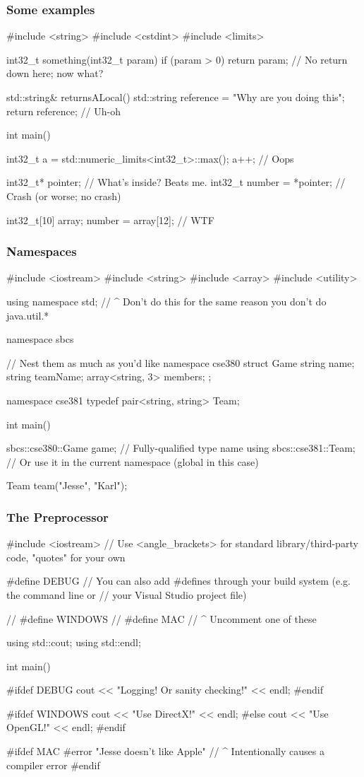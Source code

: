 \documentclass[glossy]{beamer}
\begin{document}
\begin{frame}[fragile=singleslide]
  \frametitle{Some examples}
  \begin{cppcode}
#include <string>
#include <cstdint> 
#include <limits> 

int32_t something(int32_t param) { 
  if (param > 0) return param; 
  // No return down here; now what? 
} 

std::string& returnsALocal() { 
  std::string reference = "Why are you doing this"; 
  return reference; // Uh-oh 
} 

int main() { 
  int32_t a = std::numeric_limits<int32_t>::max(); 
  a++; // Oops 

  int32_t* pointer; // What's inside?  Beats me.
  int32_t number = *pointer; // Crash (or worse; no crash)

  int32_t[10] array; 
  number = array[12]; // WTF 
}
  \end{cppcode}
\end{frame}

\begin{frame}[fragile=singleslide]
  \frametitle{Namespaces}
  \begin{cppcode}
#include <iostream>
#include <string>
#include <array>
#include <utility>

using namespace std;
// ^ Don't do this for the same reason you don't do java.util.*

namespace sbcs { // Nest them as much as you'd like
  namespace cse380 {
    struct Game {
      string name;
      string teamName;
      array<string, 3> members;
    };
  }

  namespace cse381 {
    typedef pair<string, string> Team;
  }
}

int main() {
  sbcs::cse380::Game game; // Fully-qualified type name
  using sbcs::cse381::Team; // Or use it in the current namespace (global in this case)

  Team team("Jesse", "Karl");
}
  \end{cppcode}
\end{frame}

\begin{frame}[fragile=singleslide]
  \frametitle{The Preprocessor}
  \begin{cppcode}
#include <iostream>
// Use <angle_brackets> for standard library/third-party code, "quotes" for your own 

#define DEBUG 
// You can also add #defines through your build system (e.g. the command line or 
// your Visual Studio project file) 

// #define WINDOWS 
// #define MAC 
// ^ Uncomment one of these 

using std::cout; 
using std::endl; 

int main() { 
  #ifdef DEBUG 
  cout << "Logging! Or sanity checking!" << endl;
  #endif 

  #ifdef WINDOWS
  cout << "Use DirectX!" << endl; 
  #else 
  cout << "Use OpenGL!" << endl; 
  #endif 

  #ifdef MAC 
    #error "Jesse doesn't like Apple"
    // ^ Intentionally causes a compiler error
  #endif
}
  \end{cppcode}
\end{frame}
\end{document}

